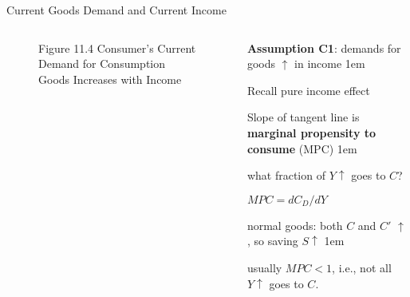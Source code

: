 \documentclass[11pt,aspectratio=43]{beamer}
\let\olditemize=\itemize
\let\endolditemize=\enditemize
\renewenvironment{itemize}{\olditemize \itemsep1em}{\endolditemize}
\theoremstyle{definition}
\begin{document}
\begin{frame}{Current Goods Demand and Current Income}
\label{slide:Current_Goods_Demand_and_Current_Income}
    \begin{columns}
        \begin{column}{0.5\textwidth}
            \begin{figure}
                \caption{\scriptsize Figure 11.4 Consumer’s Current Demand for Consumption Goods Increases with Income}
            \end{figure}
        \end{column}
        \begin{column}{0.5\textwidth}
            \textbf{Assumption C1}: demands for goods $ \uparrow  $ in income
            \begin{itemize}
                \item Recall \alert{pure income effect}
                \item Slope of tangent line is \textbf{marginal propensity to consume} (MPC)
                \begin{itemize}
                    \item what fraction of $ Y \uparrow  $ goes to $ C $?
                    \item $ MPC = d C_{D} / dY $
                \end{itemize}
                \item normal goods: both $ C $ and $ C' $ $ \uparrow  $, so saving $ S \uparrow  $
                \begin{itemize}
                    \item usually $ MPC < 1 $, i.e., not all $ Y \uparrow  $ goes to $ C $.
                \end{itemize}
            \end{itemize}
        \end{column}
    \end{columns}
\end{frame}
\end{document}
